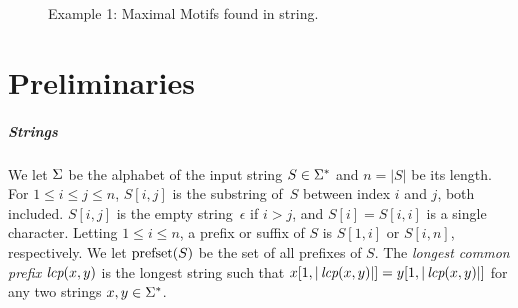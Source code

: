 \begin{figure}[t]
        \centering
        \quad
        \caption{Example 1: Maximal Motifs found in string.}\label{ex:one}
\end{figure}


\section{Preliminaries}
\label{sec:preliminaries}

\subparagraph{Strings}
%
We let $\Sigma$ be the alphabet of the input string $S \in \Sigma^*$ and $n = |S|$ be its length.
For $1 \leq i \leq j \leq n$, $S[i, j]$ is the substring of~$S$ between index $i$ and $j$, both included. $S[i, j]$ is the empty string~$\epsilon$ if $i > j$, and $S[i] = S[i, i]$ is a single character. Letting $1 \leq i \leq n$, a prefix or suffix of $S$ is $S[1, i]$ or $S[i, n]$, respectively. We let $\operatorname{prefset}(S)$ be the set of all prefixes of $S$. The \emph{longest common prefix} $\operatorname{\textit{lcp}}(x, y)$ is the longest string such that $x[1, |\operatorname{\textit{lcp}}(x, y)|] = y[1, |\operatorname{\textit{lcp}}(x, y)|]$ for any two strings $x, y \in \Sigma^*$.  


